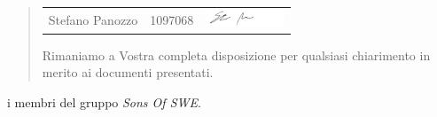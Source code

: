 \documentclass{letter}
\newcommand{\gruppo}{\emph{Sons Of SWE}}
\begin{document}
\begin{letter}
\begin{quotation}
\begin{longtable}{ c  c  c }
		Stefano Panozzo & 1097068 & \includegraphics[height=0.5cm]{firme/StefanoPanozzo.png} \\
		
	\end{longtable}

Rimaniamo a Vostra completa disposizione per qualsiasi chiarimento in merito ai documenti presentati.

	\end{quotation}
{
\setlength\parindent{24pt}
\indent i membri del gruppo \gruppo.
}
\end{letter}
\end{document}
